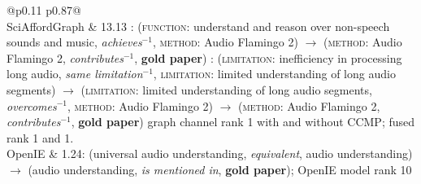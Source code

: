 \begin{table}[H]
\centering
\resulttablestyle
\setlength{\tabcolsep}{5pt}
\renewcommand{\arraystretch}{1.25}
\begin{tabular}{@{}p{0.11\linewidth} p{0.87\linewidth}@{}}
\toprule
{} \\
\midrule
SciAfford\-Graph &
13.13 :\; (\textsc{function}: understand and reason over non-speech sounds and music,\; \textit{achieves}$^{-1}$,\;
\textsc{method}: Audio Flamingo 2) $\rightarrow$ (\textsc{method}: Audio Flamingo 2,\; \textit{contributes}$^{-1}$,\; \textbf{gold paper})  :\; (\textsc{limitation}: inefficiency in processing long audio,\; \textit{same limitation}$^{-1}$,\;
\textsc{limitation}: limited understanding of long audio segments) $\rightarrow$
(\textsc{limitation}: limited understanding of long audio segments,\; \textit{overcomes}$^{-1}$,\;
\textsc{method}: Audio Flamingo 2) $\rightarrow$ (\textsc{method}: Audio Flamingo 2,\; \textit{contributes}$^{-1}$,\; \textbf{gold paper}) \newline
{\footnotesize graph channel rank 1 with and without CCMP; fused rank 1 and 1.} \\
OpenIE &
1.24:\; (universal audio understanding,\; \textit{equivalent},\; audio understanding) $\rightarrow$
(audio understanding,\; \textit{is mentioned in},\; \textbf{gold paper});\; OpenIE model rank 10 \\
\bottomrule
\end{tabular}
\caption{Path interpretations for Figure~\ref{fig:qual-cs-3}. Top-weighted routes from the query's seed frames to the gold under the trained reasoner (beam search over the gradient of the graph score with respect to each layer's edge weights, as in NBFNet and GFM-RAG); $r^{-1}$ is the inverse relation; the CCMP gate on every hop is 1.00 except where shown. Grey weights are the same weights with the CCMP gate switched off: identical routes in the same order, all weights within 7\%, so CCMP is inert on this same-discipline query.}
\label{tab:paths-cs-3}
\end{table}
